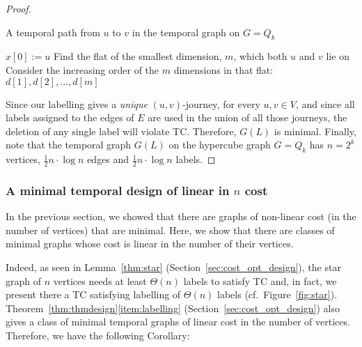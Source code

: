 \documentclass[a4paper,UKenglish]{article}
\begin{document}
\begin{proof}
\begin{algorithm}[ht]
\caption{A temporal path from $u$ to $v$ in the temporal graph on $G=Q_k$}
\label{journeyQn}
\SetAlgoLined

	$x[0]:=u$\;
	Find the flat of the smallest dimension, $m$, which both $u$ and $v$ lie on\;
	Consider the increasing order of the $m$ dimensions in that flat: $d[1], d[2],\ldots, d[m]$\;
\end{algorithm}


Since our labelling gives a \emph{unique} $(u,v)$-journey, for every $u,v\in V$, and since all labels assigned to the edges of $E$ are used in the union of all those journeys, the deletion of any single label will violate TC. Therefore, $G(L)$ is minimal. Finally, note that the temporal graph $G(L)$ on the hypercube graph $G=Q_k$ has $n=2^k$ vertices, $\frac{1}{2}n\cdot \log{n}$ edges and $\frac{1}{2}n\cdot \log{n}$ labels.
\end{proof}

















\subsubsection{A minimal temporal design of linear in \texorpdfstring{$n$}{n} cost}
In the previous section, we showed that there are graphs of non-linear cost (in the number of vertices) that are minimal. Here, we show that there are classes of minimal graphs whose cost is linear in the number of their vertices.


Indeed, as seen in Lemma~\ref{thm:star} (Section~\ref{sec:cost_opt_design}), the star graph of $n$ vertices needs at least $\Theta(n)$ labels to satisfy TC and, in fact, we present there a TC satisfying labelling of $\Theta(n)$ labels (cf.~Figure~\ref{fig:star}). Theorem~\ref{thm:thmdesign}\ref{item:labelling} (Section~\ref{sec:cost_opt_design}) also gives a class of minimal temporal graphs of linear cost in the number of vertices. Therefore, we have the following Corollary:
\end{document}
